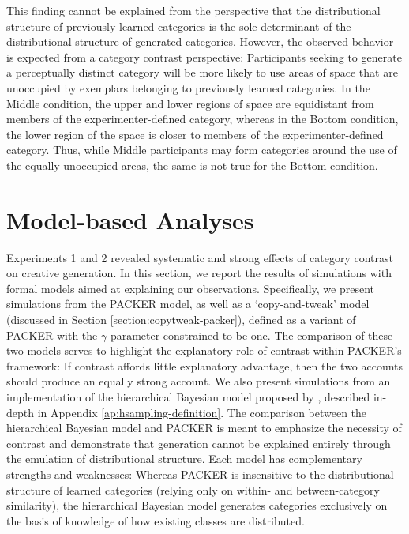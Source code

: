 \documentclass[12pt]{article}
\begin{document}
\begin{flushleft}
This finding cannot be explained from the perspective that the distributional structure of previously learned categories is the sole determinant of the distributional structure of generated categories. However, the observed behavior is expected from a category contrast perspective: Participants seeking to generate a perceptually distinct category will be more likely to use areas of space that are unoccupied by exemplars belonging to previously learned categories. In the Middle condition, the upper and lower regions of space are equidistant from members of the experimenter-defined category, whereas in the Bottom condition, the lower region of the space is closer to members of the experimenter-defined category. Thus, while Middle participants may form categories around the use of the equally unoccupied areas, the same is not true for the Bottom condition.

\section{Model-based Analyses}

Experiments 1 and 2 revealed systematic and strong effects of category contrast on creative generation. In this section, we report the results of simulations with formal models aimed at explaining our observations. Specifically, we present simulations from the PACKER model, as well as a `copy-and-tweak' model (discussed in Section \ref{section:copytweak-packer}), defined as a variant of PACKER with the $\gamma$ parameter constrained to be one. The comparison of these two models serves to highlight the explanatory role of contrast within PACKER's framework: If contrast affords little explanatory advantage, then the two accounts should produce an equally strong account. We also present simulations from an implementation of the hierarchical Bayesian model proposed by \cite{jern2013probabilistic}, described in-depth in Appendix \ref{ap:hsampling-definition}. The comparison between the hierarchical Bayesian model and PACKER is meant to emphasize the necessity of contrast and demonstrate that generation cannot be explained entirely through the emulation of distributional structure. Each model has complementary strengths and weaknesses: Whereas PACKER is insensitive to the distributional structure of learned categories (relying only on within- and between-category similarity), the hierarchical Bayesian model generates categories exclusively on the basis of knowledge of how existing classes are distributed. 


\end{flushleft}
\end{document}
